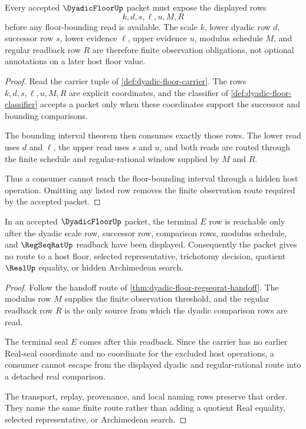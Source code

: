 \begin{theorem}
\label{thm:dyadic-floor-window-obligations}
Every accepted $\DyadicFloorUp$ packet must expose the displayed rows
$$
k,d,s,\ell,u,M,R
$$
before any floor-bounding read is available. The scale $k$, lower dyadic row $d$, successor row $s$, lower evidence $\ell$, upper evidence $u$, modulus schedule $M$, and regular readback row $R$ are therefore finite observation obligations, not optional annotations on a later host floor value.
\end{theorem}
\begin{proof}
Read the carrier tuple of \autoref{def:dyadic-floor-carrier}. The rows $k,d,s,\ell,u,M,R$ are explicit coordinates, and the classifier of \autoref{def:dyadic-floor-classifier} accepts a packet only when these coordinates support the successor and bounding comparisons.

The bounding interval theorem then consumes exactly those rows. The lower read uses $d$ and $\ell$, the upper read uses $s$ and $u$, and both reads are routed through the finite schedule and regular-rational window supplied by $M$ and $R$.

Thus a consumer cannot reach the floor-bounding interval through a hidden host operation. Omitting any listed row removes the finite observation route required by the accepted packet.
\end{proof}

\begin{theorem}
\label{thm:dyadic-floor-real-seal-nonescape}
In an accepted $\DyadicFloorUp$ packet, the terminal $E$ row is reachable only after the dyadic scale row, successor row, comparison rows, modulus schedule, and $\RegSeqRatUp$ readback have been displayed. Consequently the packet gives no route to a host floor, selected representative, trichotomy decision, quotient $\RealUp$ equality, or hidden Archimedean search.
\end{theorem}
\begin{proof}
Follow the handoff route of \autoref{thm:dyadic-floor-regseqrat-handoff}. The modulus row $M$ supplies the finite observation threshold, and the regular readback row $R$ is the only source from which the dyadic comparison rows are read.

The terminal seal $E$ comes after this readback. Since the carrier has no earlier Real-seal coordinate and no coordinate for the excluded host operations, a consumer cannot escape from the displayed dyadic and regular-rational route into a detached real comparison.

The transport, replay, provenance, and local naming rows preserve that order. They name the same finite route rather than adding a quotient Real equality, selected representative, or Archimedean search.
\end{proof}

